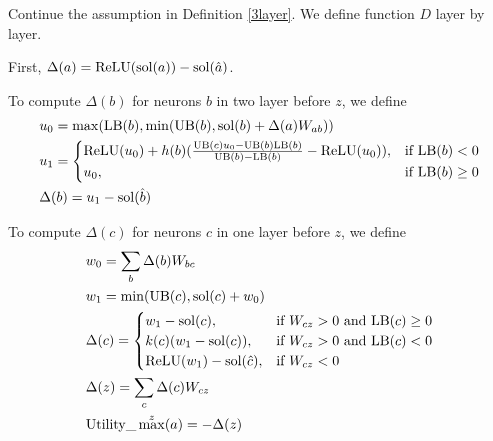 \begin{definition}
	Continue the assumption in Definition \ref{3layer}. We define function $D$ layer by layer.
	
	First, $\Delta(a) = \mathrm{ReLU}(\mathrm{sol}(a))-\mathrm{sol}(\hat{a})$.
	
To compute $\Delta(b)$ for neurons $b$ in two layer before $z$, we define \begin{align}
	&u_0 = \max(\mathrm{LB}(b),\min(\mathrm{UB}(b),  \mathrm{sol}(b)+\Delta(a)W_{ab}))\\
	&u_1 = \begin{cases}
		\mathrm{ReLU}(u_0)+h(b)(\frac{\mathrm{UB}(c)u_0-\mathrm{UB}(b)\mathrm{LB}(b)}{\mathrm{UB}(b)-\mathrm{LB}(b)}-\mathrm{ReLU}(u_0)), & \text{if }\mathrm{LB}(b) < 0\\
	u_0, & \text{if }  \mathrm{LB}(b) \geq 0
	\end{cases}\\
	&\Delta(b) = u_1-\mathrm{sol}(\hat{b})
\end{align}
	
	To compute $\Delta(c)$ for neurons $c$ in one layer before $z$, we define 
	\begin{align}
		&w_0 = \sum_b \Delta(b)W_{bc}\\
		&w_1 = \min(\mathrm{UB}(c),\mathrm{sol}(c)+w_0)\\		
		&\Delta(c) =
		\begin{cases}
			w_1-\mathrm{sol}({c}), & \text{if }W_{cz} > 0 \text{ and } \mathrm{LB}(c)\geq 0\\
		k(c)(w_1-\mathrm{sol}({c})), & \text{if }W_{cz} > 0 \text{ and } \mathrm{LB}(c)< 0\\
		\mathrm{ReLU}(w_1)-\mathrm{sol}(\hat{c})	, & \text{if }  W_{cz} < 0
		\end{cases}\\
		&\Delta(z) = \sum_c \Delta(c)W_{cz}\\
		&\mathrm{Utility}\_\max^z(a) = -\Delta(z)
	\end{align}
\end{definition}
		
\fi
